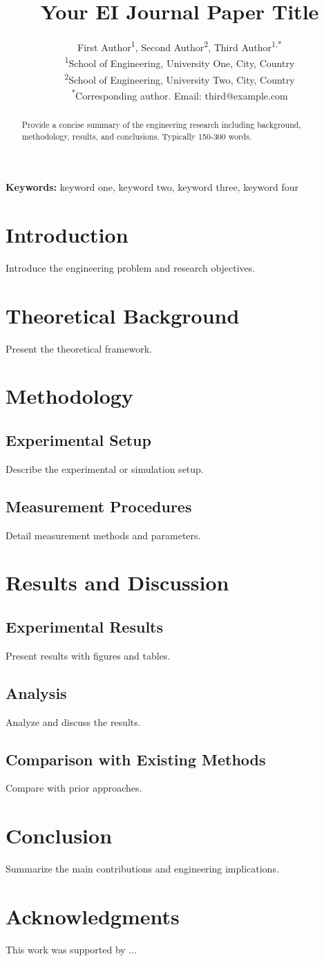 \documentclass[12pt,a4paper]{article}
\title{\textbf{Your EI Journal Paper Title}}
\author{
  First Author\textsuperscript{1},
  Second Author\textsuperscript{2},
  Third Author\textsuperscript{1,*} \\[10pt]
  \textsuperscript{1}School of Engineering, University One, City, Country \\
  \textsuperscript{2}School of Engineering, University Two, City, Country \\[6pt]
  \textsuperscript{*}Corresponding author. Email: third@example.com
}
\date{}
\begin{document}
\maketitle

\begin{abstract}
Provide a concise summary of the engineering research including background, methodology, results, and conclusions. Typically 150-300 words.
\end{abstract}

\noindent\textbf{Keywords:} keyword one, keyword two, keyword three, keyword four

\section{Introduction}
Introduce the engineering problem and research objectives.

\section{Theoretical Background}
Present the theoretical framework.

\section{Methodology}
\subsection{Experimental Setup}
Describe the experimental or simulation setup.

\subsection{Measurement Procedures}
Detail measurement methods and parameters.

\section{Results and Discussion}
\subsection{Experimental Results}
Present results with figures and tables.

\subsection{Analysis}
Analyze and discuss the results.

\subsection{Comparison with Existing Methods}
Compare with prior approaches.

\section{Conclusion}
Summarize the main contributions and engineering implications.

\section*{Acknowledgments}
This work was supported by ...



\end{document}
